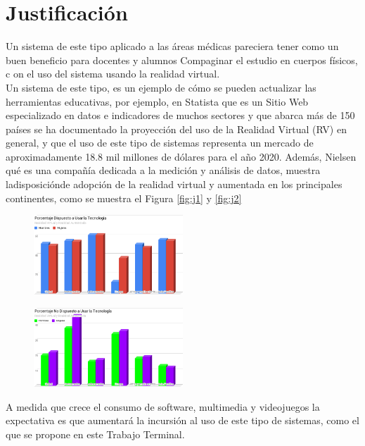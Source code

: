 \section{Justificación}
Un sistema de este tipo aplicado a las áreas médicas pareciera tener como un buen beneficio para docentes y alumnos Compaginar el estudio en cuerpos físicos, c
on el uso del sistema usando la realidad virtual\cite{norton1994integrating}.\\
Un sistema de este tipo, es un ejemplo de cómo se pueden actualizar las herramientas educativas, por ejemplo,  en Statista\cite{web1} que es un Sitio Web especializado 
en datos e indicadores de muchos sectores y que abarca más de 150 países se ha documentado la proyección del uso de la Realidad Virtual (RV) en general, y que el 
uso de este tipo de sistemas representa un mercado de aproximadamente 18.8 mil millones de dólares para el año 2020. Además, Nielsen\cite{web2} qué es una compañía dedicada 
a la medición y análisis de datos,  muestra ladisposiciónde adopción de la realidad virtual y aumentada en los principales continentes, como se muestra el Figura \ref{fig:j1} y \ref{fig:j2}
\begin{figure}[H]
	\begin{center}
 		\includegraphics[width = 0.5\textwidth]{v3/images/chart2.png}
	\end{center} 
\end{figure}
\begin{figure}[H]
	\begin{center}
 		\includegraphics[width = 0.5\textwidth]{v3/images/chart1.png}
	\end{center} 
\end{figure}
A medida que crece el consumo de software, multimedia y videojuegos la expectativa es que aumentará la incursión al uso de este tipo  de sistemas, como el que se propone en este Trabajo Terminal.



